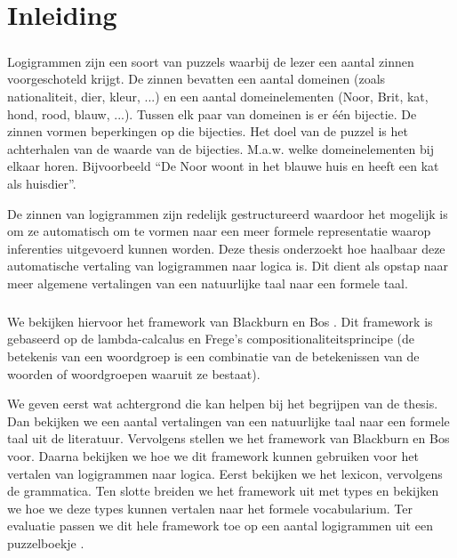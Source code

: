 \chapter{Inleiding}
\paragraph{} Logigrammen zijn een soort van puzzels waarbij de lezer een aantal zinnen voorgeschoteld krijgt. De zinnen bevatten een aantal domeinen (zoals nationaliteit, dier, kleur, ...) en een aantal domeinelementen (Noor, Brit, kat, hond, rood, blauw, ...). Tussen elk paar van domeinen is er één bijectie. De zinnen vormen beperkingen op die bijecties. Het doel van de puzzel is het achterhalen van de waarde van de bijecties. M.a.w. welke domeinelementen bij elkaar horen. Bijvoorbeeld ``De Noor woont in het blauwe huis en heeft een kat als huisdier''.

De zinnen van logigrammen zijn redelijk gestructureerd waardoor het mogelijk is om ze automatisch om te vormen naar een meer formele representatie waarop inferenties uitgevoerd kunnen worden. Deze thesis onderzoekt hoe haalbaar deze automatische vertaling van logigrammen naar logica is. Dit dient als opstap naar meer algemene vertalingen van een natuurlijke taal naar een formele taal.

\paragraph{} We bekijken hiervoor het framework van Blackburn en Bos \cite{Blackburn2005, Blackburn2006}. Dit framework is gebaseerd op de lambda-calcalus en Frege's compositionaliteitsprincipe (de betekenis van een woordgroep is een combinatie van de betekenissen van de woorden of woordgroepen waaruit ze bestaat).

We geven eerst wat achtergrond die kan helpen bij het begrijpen van de thesis. Dan bekijken we een aantal vertalingen van een natuurlijke taal naar een formele taal uit de literatuur. Vervolgens stellen we het framework van Blackburn en Bos voor. Daarna bekijken we hoe we dit framework kunnen gebruiken voor het vertalen van logigrammen naar logica. Eerst bekijken we het lexicon, vervolgens de grammatica. Ten slotte breiden we het framework uit met types en bekijken we hoe we deze types kunnen vertalen naar het formele vocabularium. Ter evaluatie passen we dit hele framework toe op een aantal logigrammen uit een puzzelboekje \cite{logigrammen}.
